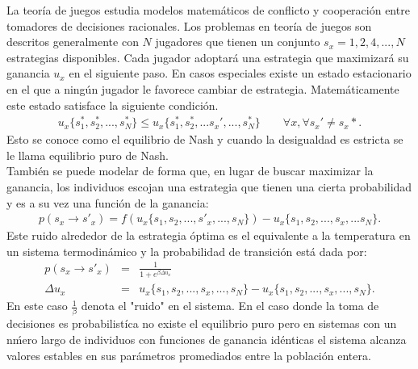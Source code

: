 \documentclass[letterpaper,12pt,oneside]{book}
\begin{document}
La teor\'ia de juegos estudia modelos matem\'aticos de conflicto y cooperaci\'on entre tomadores de decisiones racionales. Los problemas en teor\'ia de juegos son descritos generalmente con $N$ jugadores que tienen un conjunto $s_x = {1,2,4,...,N}$ estrategias disponibles. Cada jugador adoptar\'a una estrategia que maximizar\'a su ganancia $u_x$ en el siguiente paso. En casos especiales existe un estado estacionario en el que a ning\'un jugador le favorece cambiar de estrategia. Matem\'aticamente este estado satisface la siguiente condici\'on.
%
\begin{eqnarray}
  u_x \{s_1^*, s_2^*, ..., s_N^*\} \leq u_x\{s_1^*, s_2^*, ...s_x',..., s_N^*\} \qquad \forall x, \forall s_x' \neq s_x*.
\end{eqnarray}%
Esto se conoce como el equilibrio de Nash y cuando la desigualdad es estricta se le llama equilibrio puro de Nash.\\
Tambi\'en se puede modelar de forma que, en lugar de buscar maximizar la ganancia, los individuos escojan una estrategia que tienen una cierta probabilidad y es a su vez una función de la ganancia: 
%
\begin{eqnarray}
  p(s_x \to s'_x) = f(u_x \{s_1, s_2, ... , s'_x, ..., s_N\}) - u_x\{s_1, s_2, ... , s_x, ... s_N\}.
\end{eqnarray}
%
Este ruido alrededor de la estrategia \'optima es el equivalente a la temperatura en un sistema termodin\'amico y la probabilidad de transici\'on est\'a dada por: 
%
\begin{eqnarray}
  p(s_x \to s'_x) &=& \frac{1}{1+e^{\beta \Delta u_x}}\\
  \Delta u_x &=& u_x\{s_1, s_2, ... , s_x, ..., s_N\} - u_x\{s_1, s_2, ... ,s_x, ..., s_N\}.
\end{eqnarray}
%
En este caso $\frac{1}{\beta}$ denota el "ruido" en el sistema. En el caso donde la toma de decisiones es probabilist\'ica no existe el equilibrio puro pero en sistemas con un n\'mero largo de individuos con funciones de ganancia id\'enticas el sistema alcanza valores estables en sus par\'ametros promediados entre la poblaci\'on entera.
\end{document}
